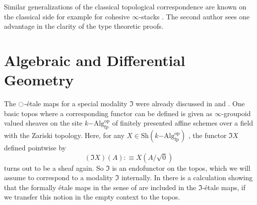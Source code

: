 \documentclass[9pt,twosided]{amsart}
\begin{document}
Similar generalizations of the classical topological correspondence are known on the classical side
for example for cohesive $\infty$-stacks \cite[Section 5.2.7]{SchreiberDcct}.
The second author sees one advantage in the clarity of the type theoretic proofs.

\section{Algebraic and Differential Geometry}

The ${\ocircle}$-étale maps for a special modality $\Im$ were already discussed in \cite{wellen-thesis} and \cite{wellen-cartan-geometry}.
One basic topos where a corresponding functor can be defined is given as $\infty$-groupoid valued sheaves on the site $k\mathrm{-Alg}^{\mathrm{op}}_{\mathrm{fp}}$ of finitely presented affine schemes over a field with the Zariski topology. Here, for any $X\in\mathrm{Sh}(k\mathrm{-Alg}^\mathrm{op}_{\mathrm{fp}})$ , the functor $\Im X$ defined pointwise by
\[ (\Im X)(A):\equiv X(A/\sqrt{0})\]
turns out to be a sheaf again. So $\Im$ is an endofunctor on the topos, which we will assume to correspond to a modality $\Im$ internally.
In \cite[Section 4.4]{wellen-thesis} there is a calculation showing that the formally étale maps in the sense of \cite[§ 17]{GrothendieckDieudonne} are included in the $\Im$-étale maps, if we transfer this notion in the empty context to the topos.
\end{document}
